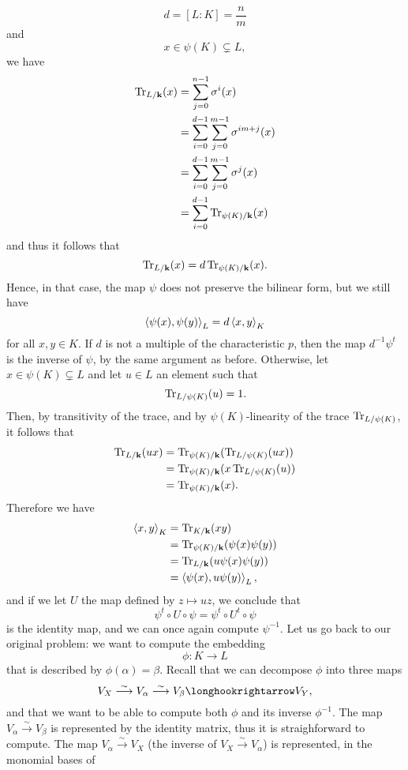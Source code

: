 \[
  d = [L:K] = \frac{n}{m}
\]
and
\[
  x\in \psi(K)\subsetneq L,
\]
we have
\begin{align*}
  \operatorname{Tr}_{L/\mathbf{k}}(x) &= \sum_{j=0}^{n-1}\sigma^i(x) \\
  &= \sum_{i=0}^{d-1}\sum_{j=0}^{m-1}\sigma^{im+j}(x)\\
  &= \sum_{i=0}^{d-1}\sum_{j=0}^{m-1}\sigma^{j}(x)\\
  &= \sum_{i=0}^{d-1}\operatorname{Tr}_{\psi(K)/\mathbf{k}}(x)
\end{align*}
and thus it follows that
\[
  \operatorname{Tr}_{L/\mathbf{k}}(x) = d\operatorname{Tr}_{\psi(K)/\mathbf{k}}(x).
\]
Hence, in that case, the map $\psi$ does not preserve the bilinear form, but we
still have
\[
  \left\langle\psi(x),\psi(y)\right\rangle_L = d\left\langle x,y\right\rangle_K
\]
for all $x, y\in K$. If $d$ is not a multiple of the characteristic $p$, then
the map $d^{-1}\psi^t$ is the inverse of $\psi$, by the same argument as before.
Otherwise, let $x\in\psi(K)\subsetneq L$ and let $u\in L$ an element such that
\[
  \operatorname{Tr}_{L/\psi(K)}(u)=1.
\]
Then, by transitivity of the trace, and by
$\psi(K)$-linearity of the trace $\operatorname{Tr}_{L/\psi(K)}$, it follows that
\begin{align*}
  \operatorname{Tr}_{L/\mathbf{k}}(ux) &= \operatorname{Tr}_{\psi(K)/\mathbf{k}}(\operatorname{Tr}_{L/\psi(K)}(ux)) \\
  &= \operatorname{Tr}_{\psi(K)/\mathbf{k}}(x\operatorname{Tr}_{L/\psi(K)}(u)) \\
  &= \operatorname{Tr}_{\psi(K)/\mathbf{k}}(x).
\end{align*}
Therefore we have
\begin{align*}
  \left\langle x,y\right\rangle_K &= \operatorname{Tr}_{K/\mathbf{k}}(xy) \\
  &= \operatorname{Tr}_{\psi(K)/\mathbf{k}}(\psi(x)\psi(y)) \\
  &= \operatorname{Tr}_{L/\mathbf{k}}(u\psi(x)\psi(y))\\
  &= \left\langle\psi(x),u\psi(y)\right\rangle_L,
\end{align*}
and if we let $U$ the map defined by $z\mapsto uz$, we conclude that
\[
  \psi^t\circ U\circ\psi=\psi^t\circ U^t\circ\psi
\]
is the identity map, and we can once again compute $\psi^{-1}$. Let us go back
to our original problem: we want to compute the embedding
\[
  \phi:K\to L
\]
that is described by $\phi(\alpha) = \beta$. Recall that we can decompose $\phi$
into three maps
\[
  V_X \overset{\sim}{\longrightarrow} V_\alpha \overset{\sim}{\longrightarrow}
  V_\beta \longhookrightarrow V_Y,
\]
and that we want to be able to compute both $\phi$ and its inverse
$\phi^{-1}$. The map $V_\alpha\overset{\sim}{\to}V_\beta$ is represented by the
identity matrix, thus it is straighforward to compute. The map
$V_\alpha\overset{\sim}{\to}V_X$ (the inverse of
$V_X\overset{\sim}{\to}V_\alpha$) is represented, in the monomial bases of
